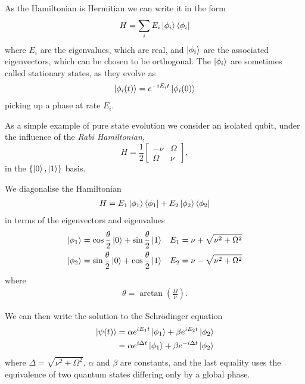 As the Hamiltonian is Hermitian we can write it in the form
\begin{align}
  H = \sum_i E_i \left\vert\phi_i\right\rangle\left\langle \phi_i\right\vert
\end{align}
where $E_i$ are the eigenvalues, which are real, and $\left\vert\phi_i\right\rangle$ are the associated eigenvectors, which can be chosen to be orthogonal. The $\left\vert\phi_i\right\rangle$ are sometimes called stationary states, as they evolve as
\begin{align}
  \left\vert\phi_i(t)\right\rangle = e^{-i E_i t}\left\vert\phi_i(0)\right\rangle
\end{align}
picking up a phase at rate $E_i$.

As a simple example of pure state evolution we consider an isolated qubit, under the influence of the \textit{Rabi Hamiltonian},
\begin{equation} \label{rabi_hamiltonian}
  H = \frac{1}{2}
\begin{bmatrix}
  -\nu & \Omega \\
  \Omega & \nu 
\end{bmatrix},
\end{equation}
in the $\{\left\vert0\right\rangle, \left\vert1\right\rangle\}$ basis.

We diagonalise the Hamiltonian
\begin{align}
  H = E_1 \left\vert\phi_1\right\rangle\left\langle \phi_1\right\vert + E_2 \left\vert\phi_2\right\rangle\left\langle \phi_2\right\vert
\end{align}
in terms of the eigenvectors and eigenvalues
\begin{align}
  \left\vert\phi_1\right\rangle &=  \cos\frac{\theta}{2}\left\vert0\right\rangle + \sin\frac{\theta}{2}\left\vert1\right\rangle  &E_1 = \nu + \sqrt{\nu^2 + \Omega^2} \\
  \left\vert\phi_2\right\rangle &=  \sin\frac{\theta}{2}\left\vert0\right\rangle + \cos\frac{\theta}{2}\left\vert1\right\rangle &E_2 = \nu - \sqrt{\nu^2 + \Omega^2} 
\end{align}
where
\begin{align}
  \theta = \arctan\left(\frac{\Omega}{\nu}\right).
\end{align}

We can then write the solution to the Schr\"odinger equation
\begin{align}
  \left\vert\psi(t)\right\rangle &= \alpha e^{iE_1t}\left\vert\phi_1\right\rangle +  \beta e^{iE_2t} \left\vert\phi_2\right\rangle \\
  &= \alpha e^{i\Delta t}\left\vert\phi_1\right\rangle +  \beta e^{- i\Delta t} \left\vert\phi_2\right\rangle 
\end{align}
where $\Delta = \sqrt{\nu^2 + \Omega^2}$, $\alpha$ and $\beta$ are constants, and the last equality uses the equivalence of two quantum states differing only by a global phase. 


